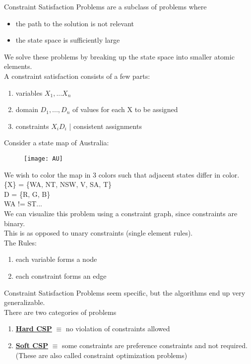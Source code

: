 \documentclass[../../lecture_notes.tex]{subfiles}
\begin{document}
\noindent Constraint Satisfaction Problems are a subclass of problems where
\begin{itemize} [itemsep=0mm]
	\item the path to the solution is not relevant
	\item the state space is sufficiently large
\end{itemize} \medskip

\noindent We solve these problems by breaking up the state space into smaller atomic elements.\\

A constraint satisfaction consists of a few parts:
\begin{enumerate} [itemsep=0mm]
	\item variables {$X_1, ... X_n$}
	\item domain {$D_1, ..., D_n$} of values for each X to be assigned
	\item constraints {$X_iD_i$ | consistent assignments}
\end{enumerate} \medskip

\noindent Consider a state map of Australia:

\begin{figure} [H]
	\centering
	\texttt{[image: AU]}
\end{figure}

\noindent We wish to color the map in 3 colors such that adjacent states differ in color.\\
\indent \{X\} = \{WA, NT, NSW, V, SA, T\}\\
\indent D = \{R, G, B\}\\
\indent WA != ST...\\
We can visualize this problem using a constraint graph, since constraints are binary.\\
This is as opposed to unary constraints (single element rules).\\
The Rules:
\begin{enumerate} [itemsep=0mm]
	\item each variable forms a node
	\item each constraint forms an edge
\end{enumerate} \medskip

\noindent Constraint Satisfaction Problems seem specific, but the algorithms end up very generalizable.\\
 There are two categories of problems
 \begin{enumerate} [itemsep=0mm]
	\item \textbf{\underline{Hard CSP}} $\equiv$ no violation of constraints allowed
	\item \textbf{\underline{Soft CSP}} $\equiv$ some constraints are preference constraints and not required.\\
                (These are also called constraint optimization problems)
\end{enumerate} \medskip
\end{document}
